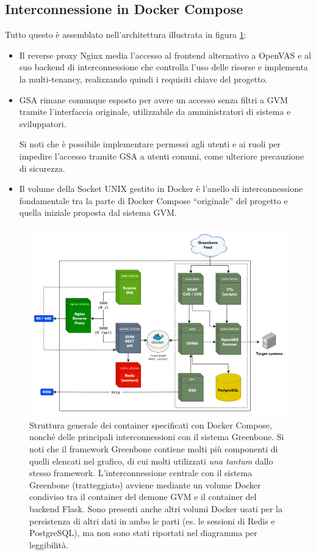 \subsection{Interconnessione in Docker Compose}
\label{compose-architecture}
Tutto questo è assemblato nell'architettura illustrata in figura \ref{fig:architecture}:
\begin{itemize}
    \item Il reverse proxy Nginx media l'accesso al frontend alternativo a OpenVAS e al suo backend di interconnessione che controlla l'uso delle risorse e implementa la multi-tenancy, realizzando quindi i requisiti chiave del progetto.
    \item GSA rimane comunque esposto per avere un accesso senza filtri a GVM tramite l'interfaccia originale, utilizzabile da amministratori di sistema e sviluppatori.
    
    Si noti che è possibile implementare permessi agli utenti e ai ruoli per impedire l'accesso tramite GSA a utenti comuni, come ulteriore precauzione di sicurezza.
    \item Il volume della Socket UNIX gestito in Docker è l'anello di interconnessione fondamentale tra la parte di Docker Compose ``originale'' del progetto e quella iniziale proposta dal sistema GVM.
\end{itemize}
\begin{figure}
    \centering
    \includegraphics[width=\textwidth]{img/systems.png}
    \caption[Struttura generale dei container specificati con Docker Compose]{Struttura generale dei container specificati con Docker Compose, nonché delle principali interconnessioni con il sistema Greenbone. Si noti che il framework Greenbone contiene molti più componenti di quelli elencati nel grafico, di cui molti utilizzati \emph{una tantum} dallo stesso framework. L'interconnessione centrale con il sistema Greenbone (tratteggiato) avviene mediante un volume Docker condiviso tra il container del demone GVM e il container del backend Flask. Sono presenti anche altri volumi Docker usati per la persistenza di altri dati in ambo le parti (es. le sessioni di Redis e PostgreSQL), ma non sono stati riportati nel diagramma per leggibilità.}
    \label{fig:architecture}
\end{figure}